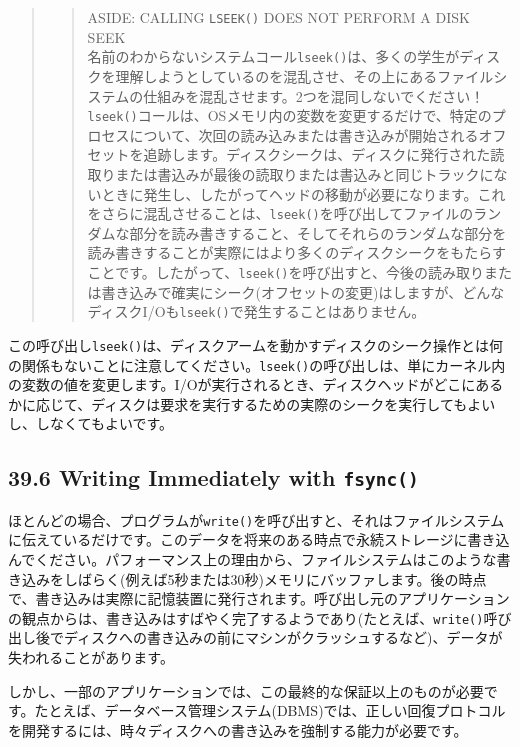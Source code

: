 \begin{quote}
\begin{quote}
ASIDE: CALLING \texttt{LSEEK()} DOES NOT PERFORM A DISK SEEK\\
名前のわからないシステムコール\texttt{lseek()}は、多くの学生がディスクを理解しようとしているのを混乱させ、その上にあるファイルシステムの仕組みを混乱させます。2つを混同しないでください！\texttt{lseek()}コールは、OSメモリ内の変数を変更するだけで、特定のプロセスについて、次回の読み込みまたは書き込みが開始されるオフセットを追跡します。ディスクシークは、ディスクに発行された読取りまたは書込みが最後の読取りまたは書込みと同じトラックにないときに発生し、したがってヘッドの移動が必要になります。これをさらに混乱させることは、\texttt{lseek()}を呼び出してファイルのランダムな部分を読み書きすること、そしてそれらのランダムな部分を読み書きすることが実際にはより多くのディスクシークをもたらすことです。したがって、\texttt{lseek()}を呼び出すと、今後の読み取りまたは書き込みで確実にシーク(オフセットの変更)はしますが、どんなディスクI/Oも\texttt{lseek()}で発生することはありません。
\end{quote}
\end{quote}

この呼び出し\texttt{lseek()}は、ディスクアームを動かすディスクのシーク操作とは何の関係もないことに注意してください。\texttt{lseek()}の呼び出しは、単にカーネル内の変数の値を変更します。I/Oが実行されるとき、ディスクヘッドがどこにあるかに応じて、ディスクは要求を実行するための実際のシークを実行してもよいし、しなくてもよいです。

\hypertarget{writing-immediately-with-fsync}{%
\subsection*{\texorpdfstring{39.6 Writing Immediately with
\texttt{fsync()}}{39.6 Writing Immediately with fsync()}}\label{writing-immediately-with-fsync}}

ほとんどの場合、プログラムが\texttt{write()}を呼び出すと、それはファイルシステムに伝えているだけです。このデータを将来のある時点で永続ストレージに書き込んでください。パフォーマンス上の理由から、ファイルシステムはこのような書き込みをしばらく(例えば5秒または30秒)メモリにバッファします。後の時点で、書き込みは実際に記憶装置に発行されます。呼び出し元のアプリケーションの観点からは、書き込みはすばやく完了するようであり(たとえば、\texttt{write()}呼び出し後でディスクへの書き込みの前にマシンがクラッシュするなど)、データが失われることがあります。

しかし、一部のアプリケーションでは、この最終的な保証以上のものが必要です。たとえば、データベース管理システム(DBMS)では、正しい回復プロトコルを開発するには、時々ディスクへの書き込みを強制する能力が必要です。

